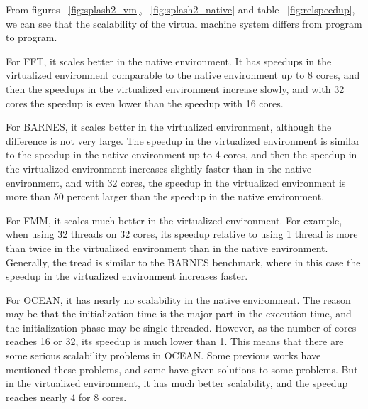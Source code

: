 From figures ~\ref{fig:splash2_vm}, ~\ref{fig:splash2_native} and
table ~\ref{fig:relspeedup}, 
we can see that the scalability of the virtual machine system differs from
program to program.

For FFT, it scales better in the native environment. It has speedups 
in the virtualized environment comparable to the native environment up to
8 cores, and then the speedups in the virtualized environment increase
slowly, and with 32 cores the speedup is even lower than the speedup
with 16 cores.

For BARNES, it scales better in the virtualized environment, although the
difference is not very large. The speedup in the virtualized environment
is similar to the speedup in the native environment up to 4 cores, and then
the speedup in the virtualized environment increases slightly faster than
in the native environment, and with 32 cores, the speedup in the virtualized
environment is more than 50 percent larger than the speedup in the native
environment.

For FMM, it scales much better in the virtualized environment. For example, 
when using 32 threads on 32 cores, its speedup relative to using 1 thread 
is more than twice in the virtualized environment than in the native 
environment. Generally, the tread is similar to the BARNES benchmark, where
in this case the speedup in the virtualized environment increases faster.

For OCEAN, it has nearly no scalability in the native environment. The reason
may be that the initialization time is the major part in the execution time,
and the initialization phase may be single-threaded. However, as the number
of cores reaches 16 or 32, its speedup is much lower than 1. This means that there
are some serious scalability problems in OCEAN. Some previous works \cite{rel:oceanscale}
\cite{rel:oceanscale2}
have mentioned these problems, and some have given solutions to some problems.
But in the virtualized environment, it has much better scalability, and
the speedup reaches nearly 4 for 8 cores.


